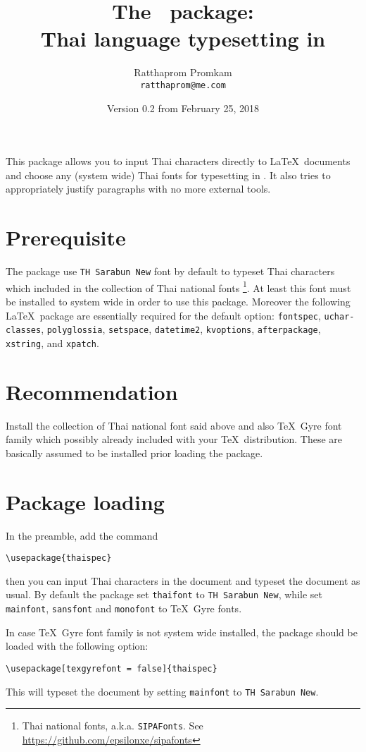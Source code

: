 \documentclass{article}
\title{The \pkgname\ package: \\Thai language typesetting in \XeLaTeX}
\author{Ratthaprom Promkam\\{\texttt{\small ratthaprom@me.com}}}
\date{Version 0.2 from February 25, 2018}
\begin{document}
\maketitle

This package allows you to input Thai characters directly to \LaTeX\ documents
and choose any (system wide) Thai fonts for typesetting in \XeLaTeX.
It also tries to appropriately justify paragraphs with no more external tools.

\tableofcontents


\section{Prerequisite}
The package use \texttt{TH Sarabun New} font by default to typeset Thai characters
which included in the collection of Thai national fonts
\footnote{Thai national fonts, a.k.a. \texttt{SIPAFonts}.
See \url{https://github.com/epsilonxe/sipafonts}}.
At least this font must be installed to system wide in order to use this package.
Moreover the following \LaTeX\ package are essentially required for the default option: \texttt{fontspec}, \texttt{uchar­classes}, \texttt{poly­glos­sia}, \texttt{setspace}, \texttt{date­time2}, \texttt{kvop­tions}, \texttt{after­pack­age}, \texttt{xstring}, and \texttt{xpatch}.

\section{Recommendation}
Install the collection of Thai national font said above and also \TeX\ Gyre font family
which possibly already included with your \TeX\ distribution.
These are basically assumed to be installed prior loading the package.

\section{Package loading}
In the preamble, add the command
\begin{verbatim}
\usepackage{thaispec}
\end{verbatim}
then you can input Thai characters in the document and typeset the document as usual.
By default the package set \texttt{thaifont} to \texttt{TH Sarabun New},
while set \texttt{mainfont}, \texttt{sansfont} and \texttt{monofont} to \TeX\ Gyre fonts.

In case \TeX\ Gyre font family is not system wide installed, the package should be loaded
with the following option:
\begin{verbatim}
\usepackage[texgyrefont = false]{thaispec}
\end{verbatim}
This will typeset the document by setting \texttt{mainfont} to \texttt{TH Sarabun New}.
\end{document}

